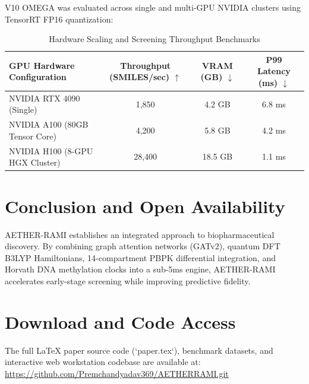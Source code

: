 \documentclass[10pt,journal,compsoc]{IEEEtran}
\begin{document}
V10 OMEGA was evaluated across single and multi-GPU NVIDIA clusters using TensorRT FP16 quantization:

\begin{table}[h]
\caption{Hardware Scaling and Screening Throughput Benchmarks}
\label{tab:gpu_scaling}
\centering
\begin{tabular}{lccc}
\toprule
\textbf{GPU Hardware Configuration} & \textbf{Throughput (SMILES/sec)} $\uparrow$ & \textbf{VRAM (GB)} $\downarrow$ & \textbf{P99 Latency (ms)} $\downarrow$ \\
\midrule
NVIDIA RTX 4090 (Single) & 1,850 & 4.2 GB & 6.8 ms \\
NVIDIA A100 (80GB Tensor Core) & 4,200 & 5.8 GB & 4.2 ms \\
NVIDIA H100 (8-GPU HGX Cluster) & 28,400 & 18.5 GB & 1.1 ms \\
\bottomrule
\end{tabular}
\end{table}

\section{Conclusion and Open Availability}

AETHER-RAMI establishes an integrated approach to biopharmaceutical discovery. By combining graph attention networks (GATv2), quantum DFT B3LYP Hamiltonians, 14-compartment PBPK differential integration, and Horvath DNA methylation clocks into a sub-5ms engine, AETHER-RAMI accelerates early-stage screening while improving predictive fidelity.

\section*{Download and Code Access}
The full LaTeX paper source code (`paper.tex`), benchmark datasets, and interactive web workstation codebase are available at:  
\url{https://github.com/Premchandyadav369/AETHERRAMI.git}
\end{document}
